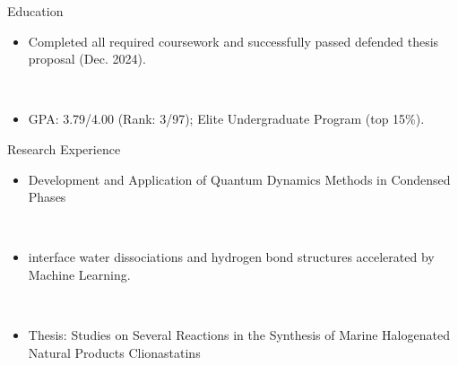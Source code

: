 \documentclass{resume}
\begin{document}
\begin{rSection}{Education}
     \\
    \begin{itemize}[noitemsep, nosep]
        \item Completed all required coursework and successfully passed defended thesis proposal (Dec. 2024).
    \end{itemize}

     \\
    \begin{itemize}[noitemsep, nosep]
        \item GPA: 3.79/4.00 (Rank: 3/97); Elite Undergraduate Program (top 15\%).
    \end{itemize}
\end{rSection}

\begin{rSection}{Research Experience}
     \\
    \begin{itemize}[noitemsep, nosep]
        \item Development and Application of Quantum Dynamics Methods in Condensed Phases
    \end{itemize}

     \\
    \begin{itemize}[noitemsep, nosep]
        \item {} interface water dissociations and hydrogen bond structures accelerated by Machine Learning.
    \end{itemize}

     \\
    \begin{itemize}[noitemsep, nosep]
        \item Thesis: Studies on Several Reactions in the Synthesis of Marine Halogenated Natural Products Clionastatins
    \end{itemize}
\end{rSection}
\end{document}
